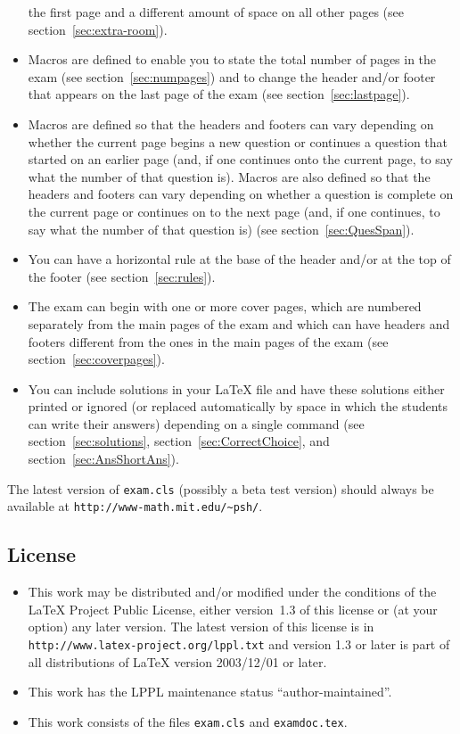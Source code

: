 \documentclass[12pt]{exam}
\begin{document}
\begin{itemize}
  the first page and a different amount of space on all other pages
  (see section~\ref{sec:extra-room}).
\item Macros are defined to enable you to state the total number of
  pages in the exam (see section~\ref{sec:numpages}) and to change the
  header and/or footer that appears on the last page of the exam (see
  section~\ref{sec:lastpage}).
\item Macros are defined so that the headers and footers can vary
  depending on whether the current page begins a new question or
  continues a question that started on an earlier page (and, if one
  continues onto the current page, to say what the number of that
  question is).  Macros are also defined so that the headers and
  footers can vary depending on whether a question is complete on the
  current page or continues on to the next page (and, if one
  continues, to say what the number of that question is) (see
  section~\ref{sec:QuesSpan}).
\item You can have a horizontal rule at the base of the header and/or
  at the top of the footer (see section~\ref{sec:rules}).
\item The exam can begin with one or more cover pages, which are
  numbered separately from the main pages of the exam and which can
  have headers and footers different from the ones in the main pages
  of the exam (see section~\ref{sec:coverpages}).
\item You can include solutions in your \LaTeX{} file and have these
  solutions either printed or ignored (or replaced automatically by
  space in which the students can write their answers) depending on a
  single command (see section~\ref{sec:solutions},
  section~\ref{sec:CorrectChoice}, and section~\ref{sec:AnsShortAns}).
\end{itemize}

The latest version of \verb"exam.cls" (possibly a
%
beta test version) should always be available at
\verb"http://www-math.mit.edu/~psh/".

\subsection{License}

\begin{itemize}
\item This work may be distributed and/or modified under the
  conditions of the \LaTeX{} Project Public
  License, either version~1.3 of this
  license or (at your option) any later version.  The latest version
  of this license is in \verb"http://www.latex-project.org/lppl.txt"
  and version 1.3 or later is part of all distributions of \LaTeX{}
  version 2003/12/01 or later.
\item This work has the LPPL maintenance status ``author-maintained''.
\item This work consists of the files \verb"exam.cls" and
  \verb"examdoc.tex".
\end{itemize}
\end{document}
